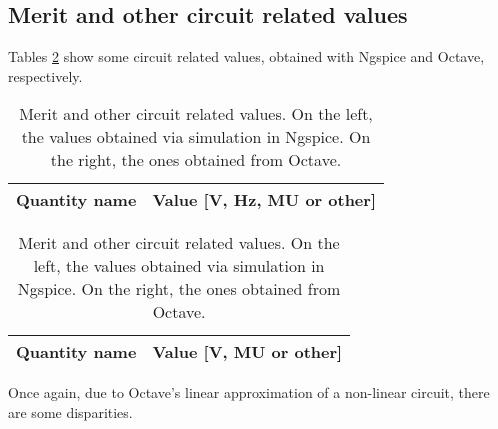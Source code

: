 \vspace{5mm}
\subsection{Merit and other circuit related values}

\vspace{3mm}
\par Tables \ref{tab_f} show some circuit related values, obtained with Ngspice and Octave, respectively.


\renewcommand{\arraystretch}{1.5}
\begin{table}[htbp]
\begin{minipage}{.3\textwidth}
\centering

\begin{tabular}{|c|c|}
\hline    
\textbf{Quantity name} & \textbf{Value [V, Hz, MU or other]} \\ \hline




\end{tabular}
\end{minipage}
\hspace{50px}
\begin {minipage}{.8\textwidth}
\centering

\begin{tabular}{|c|c|}
\hline    
\textbf{Quantity name} & \textbf{Value [V, MU or other]} \\ \hline


\end{tabular}
\end{minipage}
\caption{Merit and other circuit related values. On the left, the values obtained via simulation in Ngspice. On the right, the ones obtained from Octave.}
\label{tab_f}
\end{table}

\par Once again, due to Octave's linear approximation of a non-linear circuit, there are some disparities.





